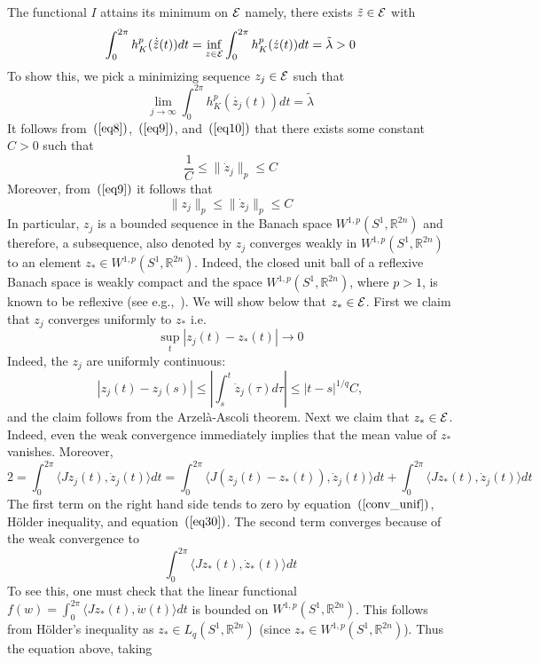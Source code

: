 \documentclass[12pt]{article}
\begin{document}
 The functional $I$ attains its minimum
on ${\cal E}$ namely, there exists $\tilde z \in {\cal E}$ with
$$ \int_0^{2\pi} h_K^p ( \dot{\tilde z}(t)) dt = \inf_{z \in
{\cal E}} \int_0^{2\pi} h_K^p ( \dot{z}(t)) dt = \tilde \lambda >
0$$ To show this, we pick a minimizing sequence $z_j \in {\cal E}$
such that
$$ \lim_{j \rightarrow \infty} \int_0^{2\pi} h_K^p ( \dot{z_j}(t))dt = \tilde \lambda$$
It follows from~$(\ref{eq8})$,~$(\ref{eq9})$, and~$(\ref{eq10})$
that there exists some constant $C > 0$ such that $$ {\frac 1 C}
\leq \| \dot{z}_j \|_{p} \leq C$$ Moreover, from~$(\ref{eq9})$ it
follows that
\begin{equation} \label{eq30} \| z_j \|_p \leq  \|  \dot{z}_j \|_{p} \leq C \end{equation} In
particular, $ z_j $ is a bounded sequence in the Banach space
$W^{1,p}(S^1,{\mathbb R}^{2n})$ and therefore, a subsequence, also
denoted by $ z_j $ converges weakly in $W^{1,p}(S^1,{\mathbb
R}^{2n})$ to an element $z_* \in W^{1,p}(S^1,{\mathbb R}^{2n})$.
Indeed, the closed unit ball of a reflexive Banach space is weakly
compact and the space $W^{1,p}(S^1,{\mathbb R}^{2n})$, where $p >1$,
is known to be reflexive (see e.g.,~\cite{Ad}). We will show below
that $z_* \in {\cal E}$. First we claim that $z_j$ converges
uniformly to $z_*$ i.e.
\begin{equation} \label{conv_unif}
 \sup_t | z_j(t) - z_*(t) | \rightarrow 0
\end{equation}
Indeed, the $z_j$ are uniformly continuous:
$$ | z_j(t) - z_j(s)| \leq  | \int_s^t {\dot z}_j(\tau) d\tau| \leq
|t-s|^{1/q} C ,$$ and the claim follows from the Arzel\`a-Ascoli
theorem. Next we claim that $z_* \in {\cal E}$. Indeed, even the
weak convergence immediately implies that the mean value of $z_*$
vanishes. Moreover,
$$ 2 = \int_0^{2 \pi} \langle J z_j(t) ,  \dot{z}_j(t) \rangle dt =
 \int_0^{2 \pi} \langle J (z_j(t)-z_*(t)) ,  \dot{z}_j(t) \rangle dt +  \int_0^{2 \pi} \langle J z_*(t) ,
 \dot{z}_j(t) \rangle dt$$ The first term on the right hand side tends to zero
 by equation~$(\ref{conv_unif})$, H\"{o}lder inequality,  and
 equation~$(\ref{eq30})$. The second term converges because of the
 weak convergence to $$ \int_0^{2 \pi} \langle J z_*(t) ,
 \dot{z}_*(t)
 \rangle dt$$
To see this, one must check that the linear functional $f(w) =
\int_0^{2 \pi} \langle J z_*(t), \dot w(t) \rangle dt$ is bounded on
$W^{1,p}(S^1, \mathbb R^{2n})$. This follows from H\"{o}lder's
inequality as $z_* \in L_q(S^1, {\mathbb R}^{2n})$ (since $z_* \in
W^{1,p}(S^1, \mathbb R^{2n})$). Thus the equation above, taking
\end{document}
